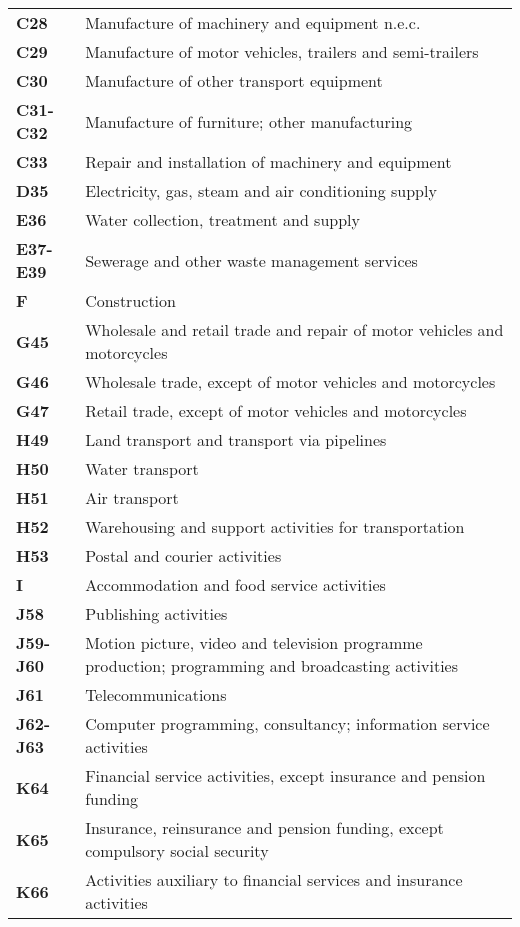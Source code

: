 \documentclass[11pt,a4paper]{article}
\begin{document}
\begin{table}[!h]
\begin{tabular}{ll}
\textbf{C28} &{Manufacture of machinery and equipment n.e.c.}\\
\textbf{C29} &{Manufacture of motor vehicles, trailers and semi-trailers}\\
\textbf{C30} &{Manufacture of other transport equipment}\\
\textbf{C31-C32} &{Manufacture of furniture; other manufacturing}\\
\textbf{C33} &{Repair and installation of machinery and equipment}\\
\textbf{D35} &{Electricity, gas, steam and air conditioning supply}\\
\textbf{E36} &{Water collection, treatment and supply}\\
\textbf{E37-E39} &{Sewerage and other waste management services}\\
\textbf{F} &{Construction}\\
\textbf{G45} &{Wholesale and retail trade and repair of motor vehicles and motorcycles}\\
\textbf{G46} &{Wholesale trade, except of motor vehicles and motorcycles}\\
\textbf{G47} &{Retail trade, except of motor vehicles and motorcycles}\\
\textbf{H49} &{Land transport and transport via pipelines}\\
\textbf{H50} &{Water transport}\\
\textbf{H51} &{Air transport}\\
\textbf{H52} &{Warehousing and support activities for transportation}\\
\textbf{H53} &{Postal and courier activities}\\
\textbf{I} &{Accommodation and food service activities}\\
\textbf{J58} &{Publishing activities}\\
\textbf{J59-J60} &{Motion picture, video and television programme production; programming and broadcasting activities}\\
\textbf{J61} &{Telecommunications}\\
\textbf{J62-J63} &{Computer programming, consultancy; information service activities}\\
\textbf{K64} &{Financial service activities, except insurance and pension funding}\\
\textbf{K65} &{Insurance, reinsurance and pension funding, except compulsory social security}\\
\textbf{K66} &{Activities auxiliary to financial services and insurance activities}\\

\end{tabular}
\end{table}
\end{document}
